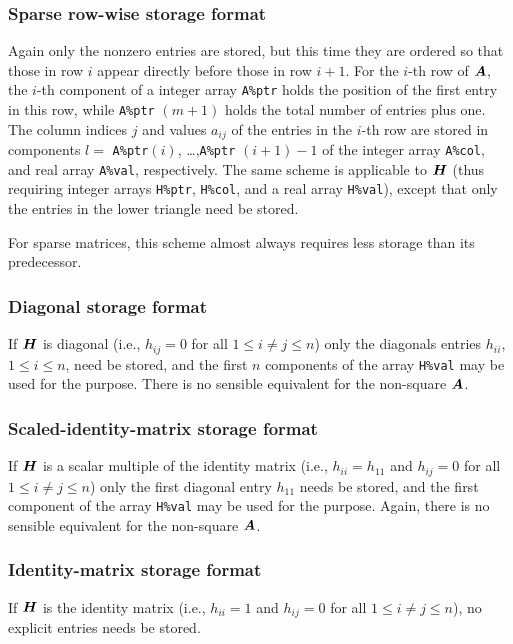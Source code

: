 \documentclass{galahad}
\begin{document}
\subsubsection{Sparse row-wise storage format}\label{rowwise}
Again only the nonzero entries are stored, but this time
they are ordered so that those in row $i$ appear directly before those
in row $i+1$. For the $i$-th row of ${\bm{A}}$, the $i$-th component of a
integer array {\tt A\%ptr} holds the position of the first entry in this row,
while {\tt A\%ptr} $(m+1)$ holds the total number of entries plus one.
The column indices $j$ and values $a_{ij}$ of the entries in the $i$-th row
are stored in components
$l =$ {\tt A\%ptr}$(i)$, \ldots ,{\tt A\%ptr} $(i+1)-1$ of the
integer array {\tt A\%col}, and real array {\tt A\%val}, respectively.
The same scheme is applicable to
${\bm{H}}$ (thus requiring integer arrays {\tt H\%ptr}, {\tt H\%col}, and
a real array {\tt H\%val}),
except that only the entries in the lower triangle need be stored.

For sparse matrices, this scheme almost always requires less storage than
its predecessor.

\subsubsection{Diagonal storage format}\label{diagonal}
If ${\bm{H}}$ is diagonal (i.e., $h_{ij} = 0$ for all $1 \leq i \neq j \leq n$)
only the diagonals entries $h_{ii}$, $1 \leq i \leq n$,  need be stored,
and the first $n$ components of the array {\tt H\%val} may be used for
the purpose. There is no sensible equivalent for the non-square ${\bm{A}}$.

\subsubsection{Scaled-identity-matrix storage format}\label{scaled-identity}
If ${\bm{H}}$ is a scalar multiple of the identity matrix
(i.e., $h_{ii} = h_{11}$  and $h_{ij} = 0$ for all $1 \leq i \neq j \leq n$)
only the first diagonal entry $h_{11}$ needs be stored,
and the first component of the array {\tt H\%val} may be used for
the purpose. Again, there is no sensible equivalent for the non-square ${\bm{A}}$.

\subsubsection{Identity-matrix storage format}\label{identity}
If ${\bm{H}}$ is the identity matrix
(i.e., $h_{ii} = 1$ and $h_{ij} = 0$ for all $1 \leq i \neq j \leq n$),
no explicit entries needs be stored.
\end{document}
